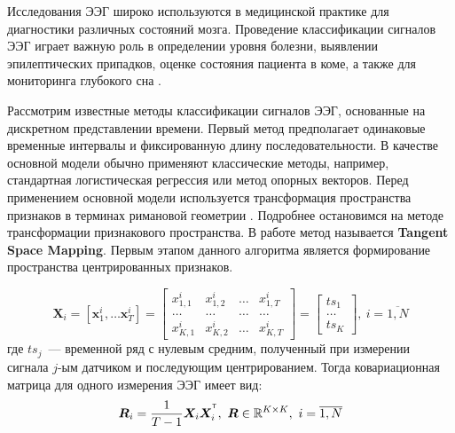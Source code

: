 \documentclass[a4paper, 12pt]{extarticle}
\begin{document}
Исследования ЭЭГ широко используются в медицинской практике для диагностики 
различных состояний мозга. Проведение классификации сигналов ЭЭГ играет важную роль в определении 
уровня болезни, выявлении эпилептических припадков, оценке состояния пациента в коме, а 
также для мониторинга глубокого сна \citep{smith2005eeg, gajic2014classification}.

Рассмотрим известные методы классификации сигналов ЭЭГ, основанные на дискретном представлении времени.
Первый метод предполагает одинаковые временные интервалы и фиксированную длину последовательности. 
В качестве основной модели обычно применяют классические методы, например, стандартная логистическая регрессия или метод опорных векторов.
Перед применением основной модели используется трансформация пространства признаков в терминах римановой геометрии \citep{barachant2010riemannian, barachant2011multiclass}.
Подробнее остановимся на методе трансформации признакового пространства. 
В работе \citep{barachant2011multiclass} метод называется \textbf{Tangent Space Mapping}.
Первым этапом данного алгоритма является формирование пространства центрированных признаков.

\begin{equation*}
	\bm{X}_i= \left[\bm{x}^i_1,\dots \bm{x}^i_{T}\right] = 
	\begin{bmatrix}
	x^i_{1,1} & x^i_{1,2} &  \dots  &  x^i_{1,T}\\
	\dots & \dots &  \dots  &  \dots\\
	x^i_{K,1} & x^i_{K,2} &  \dots  &  x^i_{K,T}
	\end{bmatrix}
	= \begin{bmatrix}
		ts_1\\
		\dots\\
		ts_K
		\end{bmatrix},~i = \overline{1, N}
	\end{equation*}
где $ts_j$~--- временной ряд с нулевым средним, полученный при измерении сигнала $j$-ым датчиком и последующим центрированием.
Тогда ковариационная матрица для одного измерения ЭЭГ имеет вид:
$$ \bm{R}_i = \dfrac{1}{T-1}\bm{X}_i\bm{X}_i^{^{\mathsf{T}}}, ~\bm{R} \in \mathbb{R}^{K\times K},~i = \overline{1, N}$$
\end{document}
